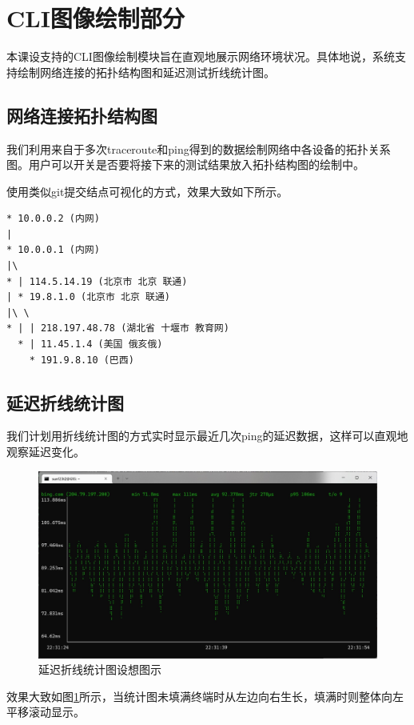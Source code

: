 \documentclass{ctexart}
\begin{document}
\section{CLI图像绘制部分}
本课设支持的CLI图像绘制模块旨在直观地展示网络环境状况。具体地说，系统支持绘制网络连接的拓扑结构图和延迟测试折线统计图。

\subsection{网络连接拓扑结构图}
我们利用来自于多次traceroute和ping得到的数据绘制网络中各设备的拓扑关系图。用户可以开关是否要将接下来的测试结果放入拓扑结构图的绘制中。

使用类似git提交结点可视化的方式，效果大致如下所示。

\begin{verbatim}
* 10.0.0.2 (内网)
|
* 10.0.0.1 (内网)
|\
* | 114.5.14.19 (北京市 北京 联通)
| * 19.8.1.0 (北京市 北京 联通)
|\ \ 
* | | 218.197.48.78 (湖北省 十堰市 教育网)
  * | 11.45.1.4 (美国 俄亥俄)
    * 191.9.8.10 (巴西)
\end{verbatim}


\subsection{延迟折线统计图}
我们计划用折线统计图的方式实时显示最近几次ping的延迟数据，这样可以直观地观察延迟变化。

\begin{figure}[h]
  \centering
  \includegraphics[width=\linewidth]{gping.jpg}
  \caption{延迟折线统计图设想图示}
  \label{image:gping}
\end{figure}

效果大致如图\ref{image:gping}所示，当统计图未填满终端时从左边向右生长，填满时则整体向左平移滚动显示。
\end{document}

